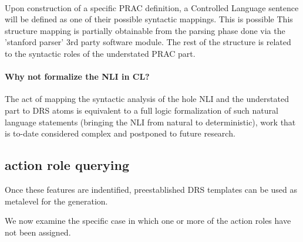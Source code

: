\documentclass[10pt,a4paper]{article}
\begin{document}
\paragraph{}
Upon construction of a specific PRAC definition, a Controlled Language sentence 
will be defined as one of their possible syntactic mappings. This is possible 
This structure mapping is partially obtainable from the parsing phase done via 
the 'stanford parser' 3rd party software module. The rest of the structure is 
related to the syntactic roles of the understated PRAC part.

\paragraph{Why not formalize the NLI in CL?}
The act of mapping the syntactic analysis of the hole NLI and the understated part 
to DRS atoms is equivalent to a full logic formalization of such natural language 
statements (bringing the NLI from natural to deterministic), work that is to-date 
considered complex and postponed to future research.

\subsection{action role querying}

Once these features are indentified, preestablished DRS templates can be used as metalevel for the generation.


We now examine the specific case in which one or more of the action roles have not been assigned.
\end{document}
